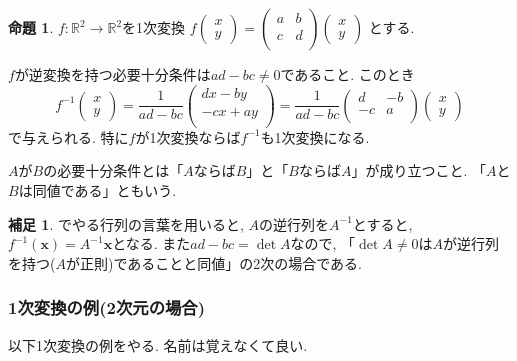 \documentclass[dvipdfmx,a4paper,11pt]{article} %
\newcommand{\R}{\mathbb{R}}
\theoremstyle{definition}
\newtheorem{prop}[thm]{命題}
\newtheorem{rem}[thm]{補足}
\begin{document}
\begin{prop}\cite[命題 1.2.3]{O}
$f : \R^2 \to \R^2$を1次変換
$
f\begin{pmatrix}
x \\ y
 \end{pmatrix} 
  = 
 \begin{pmatrix}
a &  b\\ c & d \\
 \end{pmatrix}
 \begin{pmatrix}
x \\ y
 \end{pmatrix} 
$
とする. 

$f$が逆変換を持つ必要十分条件は$ad - bc \neq 0$であること. 
このとき
$$
f^{-1}\begin{pmatrix}
x \\ y
 \end{pmatrix} 
  = 
  \frac{1}{ad-bc}
 \begin{pmatrix}
 dx -by  \\
 -cx+ ay  \\
 \end{pmatrix} 
  =
 \frac{1}{ad-bc}
 \begin{pmatrix}
 d& -b  \\
 -c& a  \\
 \end{pmatrix} 
 \begin{pmatrix}
x \\ y
 \end{pmatrix} 
$$
で与えられる. 特に$f$が1次変換ならば$f^{-1}$も1次変換になる. 
 \end{prop}
$A$が$B$の必要十分条件とは「$A$ならば$B$」と「$B$ならば$A$」が成り立つこと.
「$A$と$B$は同値である」ともいう.
 
 \begin{rem}
 \cite[2章]{O}でやる行列の言葉を用いると, $A$の逆行列を$A^{-1}$とすると, 
 $f^{-1}(\bm{x})=A^{-1}\bm{x}$となる.  
また$ad - bc = \det A$なので, 「$\det A \neq 0$は$A$が逆行列を持つ($A$が正則)であることと同値」の2次の場合である.
 \end{rem}
 

\subsubsection{1次変換の例(2次元の場合)}
以下1次変換の例をやる. 名前は覚えなくて良い. 
\end{document}
